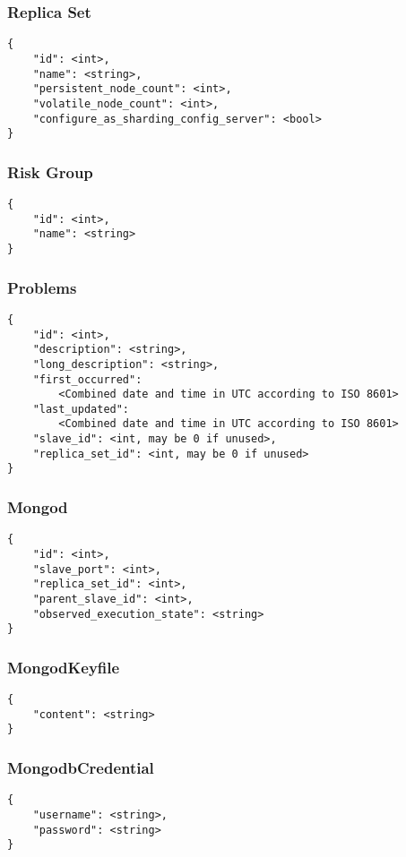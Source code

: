 \subsubsection{Replica Set}
\begin{lstlisting}
{
	"id": <int>,
	"name": <string>,
	"persistent_node_count": <int>,
	"volatile_node_count": <int>,
	"configure_as_sharding_config_server": <bool>
}
\end{lstlisting}
\subsubsection{Risk Group}
\begin{lstlisting}
{
	"id": <int>,
	"name": <string>
}
\end{lstlisting}
\subsubsection{Problems}\label{masterapi:problems}
\begin{lstlisting}
{
	"id": <int>,
	"description": <string>,
	"long_description": <string>,
	"first_occurred": 
		<Combined date and time in UTC according to ISO 8601>
	"last_updated": 
		<Combined date and time in UTC according to ISO 8601>
	"slave_id": <int, may be 0 if unused>,
	"replica_set_id": <int, may be 0 if unused>
}
\end{lstlisting}
\subsubsection{Mongod}\label{masterapi:mongod}
\begin{lstlisting}
{
	"id": <int>,
	"slave_port": <int>,
	"replica_set_id": <int>,
	"parent_slave_id": <int>,
	"observed_execution_state": <string>
}
\end{lstlisting}
\subsubsection{MongodKeyfile}\label{masterapi:mongodkeyfile}
\begin{lstlisting}
{
	"content": <string>
}
\end{lstlisting}
\subsubsection{MongodbCredential}\label{masterapi:mongodbcredential}
\begin{lstlisting}
{
	"username": <string>,
	"password": <string>
}
\end{lstlisting}
